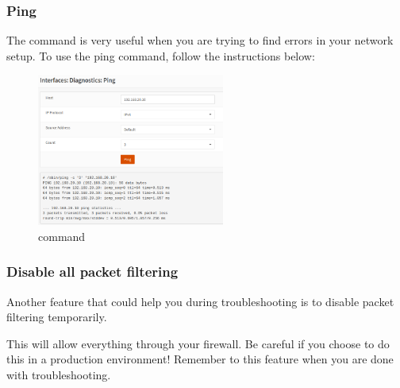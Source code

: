 \subsubsection{Ping} \label{ping}
The  command is very useful when you are trying to find errors in your network setup. To use the ping command, follow the instructions below:



\begin{figure}[h!]
    \centering
    \includegraphics[width=0.55\textwidth]{Images/admin/ping.PNG}
    \caption{ command}
    \label{opensense:admin_ping}
\end{figure}

\subsubsection{Disable all packet filtering} \label{pk_capture}
Another feature that could help you during troubleshooting is to disable packet filtering temporarily. 
\begin{importantblock}
    This will allow everything through your firewall. Be careful if you choose to do this in a production environment! Remember to  this feature when you are done with troubleshooting.
\end{importantblock}

